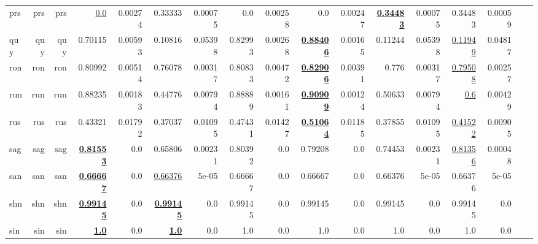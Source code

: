 \documentclass[11pt]{article}
\begin{document}
\begin{table*}[h]
{\begin{tabular}{lrrrrrrrrrrrrrrrr}
prs         & prs         & prs         & \underline{0.0}         & 0.00274         & 0.33333         & 0.00075         & 0.0         & 0.00258         & 0.0         & 0.00247         & \textbf{\underline{0.34483}}         & 0.00075         & 0.34483         & 0.00059         \\
quy         & quy         & quy         & 0.70115         & 0.00593         & 0.10816         & 0.05398         & 0.82993         & 0.00268         & \textbf{\underline{0.88406}}         & 0.00165         & 0.11244         & 0.05398         & \underline{0.11949}         & 0.04817         \\
ron         & ron         & ron         & 0.80992         & 0.00514         & 0.76078         & 0.00317         & 0.80833         & 0.00472         & \textbf{\underline{0.82906}}         & 0.00391         & 0.776         & 0.00317         & \underline{0.79508}         & 0.00257         \\
run         & run         & run         & 0.88235         & 0.00183         & 0.44776         & 0.00794         & 0.88889         & 0.00161         & \textbf{\underline{0.90909}}         & 0.00124         & 0.50633         & 0.00794         & \underline{0.6}         & 0.00429         \\
rus         & rus         & rus         & 0.43321         & 0.01792         & 0.37037         & 0.01095         & 0.47431         & 0.01427         & \textbf{\underline{0.51064}}         & 0.01185         & 0.37855         & 0.01095         & \underline{0.41522}         & 0.00905         \\
sag         & sag         & sag         & \textbf{\underline{0.81553}}         & 0.0         & 0.65806         & 0.00231         & 0.80392         & 0.0         & 0.79208         & 0.0         & 0.74453         & 0.00231         & \underline{0.81356}         & 0.00048         \\
san         & san         & san         & \textbf{\underline{0.66667}}         & 0.0         & \underline{0.66376}         & 5e-05         & 0.66667         & 0.0         & 0.66667         & 0.0         & 0.66376         & 5e-05         & 0.66376         & 5e-05         \\
shn         & shn         & shn         & \textbf{\underline{0.99145}}         & 0.0         & \textbf{\underline{0.99145}}         & 0.0         & 0.99145         & 0.0         & 0.99145         & 0.0         & 0.99145         & 0.0         & 0.99145         & 0.0         \\
sin         & sin         & sin         & \textbf{\underline{1.0}}         & 0.0         & \textbf{\underline{1.0}}         & 0.0         & 1.0         & 0.0         & 1.0         & 0.0         & 1.0         & 0.0         & 1.0         & 0.0         \\

\end{tabular}}
\end{table*}
\end{document}
